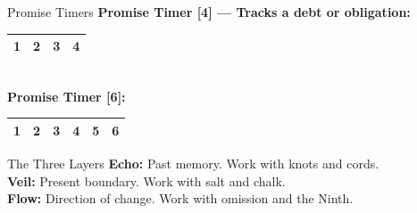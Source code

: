 \documentclass[10pt]{article}
\begin{document}
\begin{minipage}[t]{0.48\linewidth}
    \vspace{0.5em}
    
    \begin{charbox}{Promise Timers}
        \textbf{Promise Timer [4] --- Tracks a debt or obligation:}\\
        \begin{tabular}{|p{1cm}|p{1cm}|p{1cm}|p{1cm}|}
            \hline
            1 & 2 & 3 & 4 \\
            \hline
        \end{tabular}\\
        \textbf{Promise Timer [6]:}\\
        \begin{tabular}{|p{1cm}|p{1cm}|p{1cm}|p{1cm}|p{1cm}|p{1cm}|}
            \hline
            1 & 2 & 3 & 4 & 5 & 6 \\
            \hline
        \end{tabular}
    \end{charbox}
    
    \vspace{0.5em}
    
    \begin{charbox}{The Three Layers}
        \textbf{Echo:} Past memory. Work with knots and cords.\\
        \textbf{Veil:} Present boundary. Work with salt and chalk.\\
        \textbf{Flow:} Direction of change. Work with omission and the Ninth.
    \end{charbox}
\end{minipage}
\hfill
\end{document}
